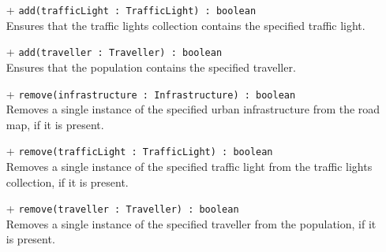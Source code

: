 \begin{itemize}
\begin{itemize}
    \item[+] \texttt{add(trafficLight : TrafficLight) : boolean} \\
    Ensures that the traffic lights collection contains the specified traffic light.
    \item[+] \texttt{add(traveller : Traveller) : boolean} \\
    Ensures that the population contains the specified traveller.
    \item[+] \texttt{remove(infrastructure : Infrastructure) : boolean} \\
    Removes a single instance of the specified urban infrastructure from the road map, if it is present.
    \item[+] \texttt{remove(trafficLight : TrafficLight) : boolean} \\
    Removes a single instance of the specified traffic light from the traffic lights collection, if it is present.
    \item[+] \texttt{remove(traveller : Traveller) : boolean} \\
    Removes a single instance of the specified traveller from the population, if it is present.
  \end{itemize}
\end{itemize} 
